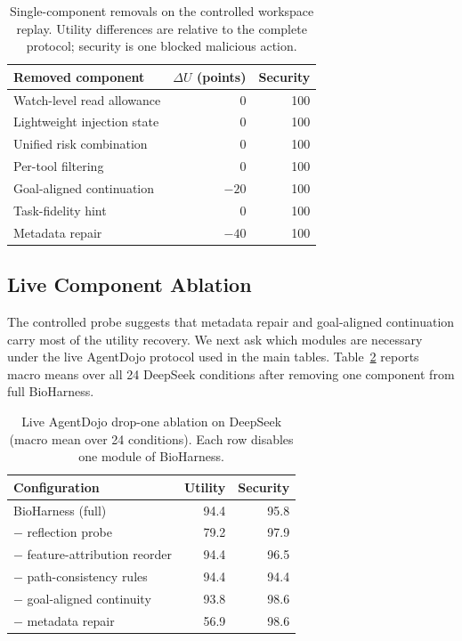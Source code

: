 \begin{table}[t]
\centering
\small
\caption{Single-component removals on the controlled workspace replay. Utility differences are relative to the complete protocol; security is one blocked malicious action.}
\label{tab:module-ablation}
\begin{tabular}{lrr}
\toprule
Removed component & $\Delta U$ (points) & Security \\
\midrule
Watch-level read allowance & 0 & 100 \\
Lightweight injection state & 0 & 100 \\
Unified risk combination & 0 & 100 \\
Per-tool filtering & 0 & 100 \\
Goal-aligned continuation & $-20$ & 100 \\
Task-fidelity hint & 0 & 100 \\
Metadata repair & $-40$ & 100 \\
\bottomrule
\end{tabular}
\end{table}

\subsection{Live Component Ablation}

The controlled probe suggests that metadata repair and goal-aligned continuation carry most of the utility recovery. We next ask which modules are necessary under the live AgentDojo protocol used in the main tables. Table~\ref{tab:live-dropone} reports macro means over all 24 DeepSeek conditions after removing one component from full BioHarness.

\begin{table}[t]
\centering
\small
\setlength{\tabcolsep}{4pt}
\caption{Live AgentDojo drop-one ablation on DeepSeek (macro mean over 24 conditions). Each row disables one module of BioHarness.}
\label{tab:live-dropone}
\begin{tabular}{lrr}
\toprule
Configuration & Utility & Security \\
\midrule
BioHarness (full) & 94.4 & 95.8 \\
$-$ reflection probe & 79.2 & 97.9 \\
$-$ feature-attribution reorder & 94.4 & 96.5 \\
$-$ path-consistency rules & 94.4 & 94.4 \\
$-$ goal-aligned continuity & 93.8 & 98.6 \\
$-$ metadata repair & 56.9 & 98.6 \\
\bottomrule
\end{tabular}
\end{table}

